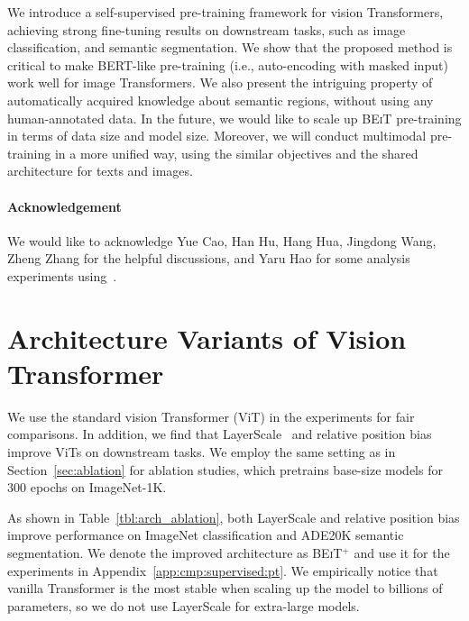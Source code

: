 \documentclass{article}
\newcommand\our{\textsc{BEiT}}
\begin{document}
We introduce a self-supervised pre-training framework for vision Transformers, achieving strong fine-tuning results on downstream tasks, such as image classification, and semantic segmentation.
We show that the proposed method is critical to make BERT-like pre-training (i.e., auto-encoding with masked input) work well for image Transformers.
We also present the intriguing property of automatically acquired knowledge about semantic regions, without using any human-annotated data.
In the future, we would like to scale up \our{} pre-training in terms of data size and model size.
Moreover, we will conduct multimodal pre-training in a more unified way, using the similar objectives and the shared architecture for texts and images.


\paragraph{Acknowledgement}
We would like to acknowledge Yue Cao, Han Hu, Hang Hua, Jingdong Wang, Zheng Zhang for the helpful discussions, and Yaru Hao for some analysis experiments using~\citep{hao2020self}.




% 

\newpage
\appendix


\section{Architecture Variants of Vision Transformer}
\label{app:arch:variants}

We use the standard vision Transformer (ViT) in the experiments for fair comparisons.
In addition, we find that LayerScale~\citep{cait} and relative position bias~\citep{unilm2,t5} improve ViTs on downstream tasks.
We employ the same setting as in Section~\ref{sec:ablation} for ablation studies, which pretrains base-size models for $300$ epochs on ImageNet-1K.

As shown in Table~\ref{tbl:arch_ablation}, both LayerScale and relative position bias improve performance on ImageNet classification and ADE20K semantic segmentation.
We denote the improved architecture as \our{}$^+$ and use it for the experiments in Appendix~\ref{app:cmp:supervised:pt}.
We empirically notice that vanilla Transformer is the most stable when scaling up the model to billions of parameters, so we do not use LayerScale for extra-large models.
\end{document}
